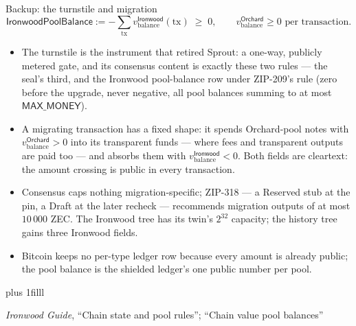 \documentclass[aspectratio=169,11pt]{beamer}
\newcommand{\src}[1]{\par\vskip0pt plus 1filll
  {\fontsize{6}{7.2}\selectfont\color{arbdim}\raggedright #1\par}}
\begin{document}
\begin{frame}{Backup: the turnstile and migration}
\vspace*{-4pt}
\setlength{\abovedisplayskip}{3pt}\setlength{\belowdisplayskip}{3pt}
\[
\mathsf{IronwoodPoolBalance} := -\sum_{\mathrm{tx}}
  v_{\mathrm{balance}}^{\mathsf{Ironwood}}(\mathrm{tx}) \;\ge\; 0,
\qquad
v_{\mathrm{balance}}^{\mathsf{Orchard}} \ge 0 \text{ per transaction.}
\]
\begin{itemize}\small
  \item The turnstile is the instrument that retired Sprout: a one-way,
    publicly metered gate, and its consensus content is exactly these two
    rules --- the seal's third, and the Ironwood pool-balance row under
    ZIP-209's rule (zero before the upgrade, never negative, all pool
    balances summing to at most $\mathsf{MAX\_MONEY}$).
  \item A migrating transaction has a fixed shape: it spends Orchard-pool
    notes with $v_{\mathrm{balance}}^{\mathsf{Orchard}} > 0$ into its
    transparent funds --- where fees and transparent outputs are paid too
    --- and absorbs them with $v_{\mathrm{balance}}^{\mathsf{Ironwood}} <
    0$. Both fields are cleartext: the amount crossing is public in every
    transaction.
  \item Consensus caps nothing migration-specific; ZIP-318 --- a Reserved
    stub at the pin, a Draft at the later recheck --- recommends
    migration outputs of at most $10\,000$ ZEC. The Ironwood tree has its
    twin's $2^{32}$ capacity; the history tree gains three Ironwood
    fields.
  \item Bitcoin keeps no per-type ledger row because every amount is
    already public; the pool balance is the shielded ledger's one public
    number per pool.
\end{itemize}
\src{\emph{Ironwood Guide}, ``Chain state and pool rules''; ``Chain value pool
  balances''}
\end{frame}
\end{document}
